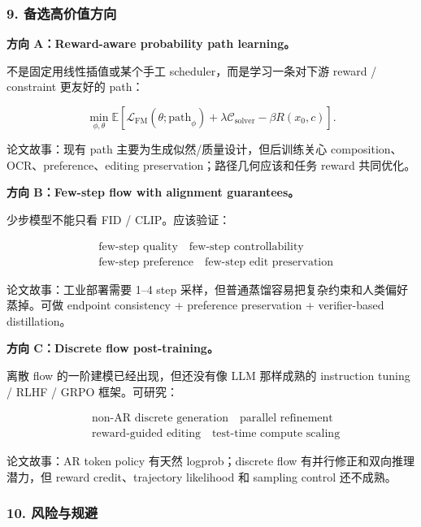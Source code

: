 \subsubsection*{9. 备选高价值方向}

\textbf{方向 A：Reward-aware probability path learning。}

不是固定用线性插值或某个手工 scheduler，而是学习一条对下游 reward / constraint 更友好的 path：

\[
\min_{\phi,\theta}
\mathbb{E}
\left[
\mathcal{L}_\text{FM}(\theta;\text{path}_\phi)
+
\lambda \mathcal{C}_\text{solver}
-
\beta R(x_0,c)
\right].
\]

论文故事：现有 path 主要为生成似然/质量设计，但后训练关心 composition、OCR、preference、editing preservation；路径几何应该和任务 reward 共同优化。

\textbf{方向 B：Few-step flow with alignment guarantees。}

少步模型不能只看 FID / CLIP。应该验证：

\[
\begin{aligned}
&\text{few-step quality}
\quad
\text{few-step controllability}\\
&\text{few-step preference}
\quad
\text{few-step edit preservation}
\end{aligned}
\]

论文故事：工业部署需要 1--4 step 采样，但普通蒸馏容易把复杂约束和人类偏好蒸掉。可做 endpoint consistency + preference preservation + verifier-based distillation。

\textbf{方向 C：Discrete flow post-training。}

离散 flow 的一阶建模已经出现，但还没有像 LLM 那样成熟的 instruction tuning / RLHF / GRPO 框架。可研究：

\[
\begin{aligned}
&\text{non-AR discrete generation}
\quad
\text{parallel refinement}\\
&\text{reward-guided editing}
\quad
\text{test-time compute scaling}
\end{aligned}
\]

论文故事：AR token policy 有天然 logprob；discrete flow 有并行修正和双向推理潜力，但 reward credit、trajectory likelihood 和 sampling control 还不成熟。

\subsubsection*{10. 风险与规避}

